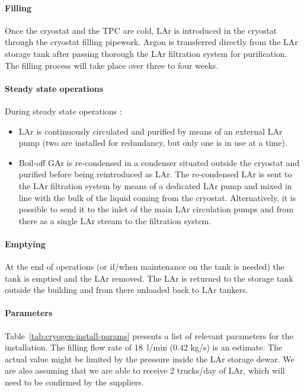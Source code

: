 \paragraph{Filling}

Once the cryostat and the TPC are cold, LAr is introduced in the cryostat through the cryostat filling pipework. Argon is transferred directly from the LAr storage tank after passing thorough the LAr filtration system for purification. The filling process will take place over three to four weeks.

\paragraph{Steady state operations}

During steady state operations :
\begin{itemize}
\item LAr is continuously circulated and purified by means of an external LAr pump (two are installed for redundancy, but only one is in use at a time).
\item Boil-off GAr is re-condensed in a condenser situated outside the cryostat and purified before being reintroduced as LAr. The re-condensed LAr is sent to the LAr filtration system by means of a dedicated LAr pump and mixed in line with the bulk of the liquid coming from the cryostat. Alternatively, it is possible to send it to the inlet of the main LAr circulation pumps and from there as a single LAr stream to the filtration system.
\end{itemize}

\paragraph{Emptying}

At the end of operations (or if/when maintenance on the tank is needed) the tank is emptied and the LAr removed. The LAr is returned to the storage tank outside the building and from there unloaded back to LAr tankers.

\paragraph{Parameters}

Table~\ref{tab:cryogen-install-params} presents a list of relevant parameters for the installation. The filling flow rate of 18~l/min (0.42 kg/s) is an estimate. The actual value might be limited by the pressure inside the LAr storage dewar. We are also assuming that we are able to receive 2 trucks/day of LAr, which will need to be confirmed by the suppliers.

